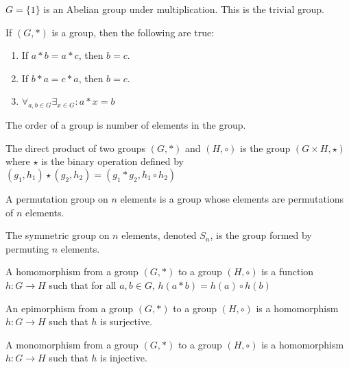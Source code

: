     \begin{example}
        $G=\{1\}$ is an Abelian group under multiplication.
        This is the trivial group.
    \end{example}
    \begin{theorem}
        If $(G,*)$ is a group, then the following are true:
        \begin{enumerate}
            \item If $a*b=a*c$, then $b=c$.
            \item If $b*a=c*a$, then $b=c$.
            \item $\forall_{{a,b}\in{G}}\exists_{{x}\in{G}}:a*x=b$
        \end{enumerate}
    \end{theorem}
    \begin{definition}
        The order of a group is number of elements in the
        group.
    \end{definition}
    \begin{definition}
        The direct product of two groups $(G,*)$ and
        $(H,\circ)$ is the group  $({G}\times{H},\star)$
        where $\star$ is the binary operation defined by
        $(g_{1},h_{1})\star(g_{2},h_{2})%
         =(g_{1}*g_{2},{h_{1}}\circ{h_{2}})$
    \end{definition}
    \begin{definition}
        A permutation group on $n$ elements is a
        group whose elements are permutations of
        $n$ elements.
    \end{definition}
    \begin{definition}
        The symmetric group on $n$ elements,
        denoted $S_{n}$, is the group formed by
        permuting $n$ elements.
    \end{definition}
    \begin{definition}
        A homomorphism from a group $(G,*)$ to
        a group $(H,\circ)$ is a function
        $h:{G}\rightarrow{H}$ such that for all
        ${a,b}\in{G}$, $h(a*b)={h(a)}\circ{h(b)}$
    \end{definition}
    \begin{definition}
        An epimorphism from a group $(G,*)$ to
        a group $(H,\circ)$ is a homomorphism
        $h:{G}\rightarrow{H}$ such that
        $h$ is surjective.
    \end{definition}
    \begin{definition}
        A monomorphism from a group $(G,*)$ to
        a group $(H,\circ)$ is a homomorphism
        $h:{G}\rightarrow{H}$ such that
        $h$ is injective.
    \end{definition}
